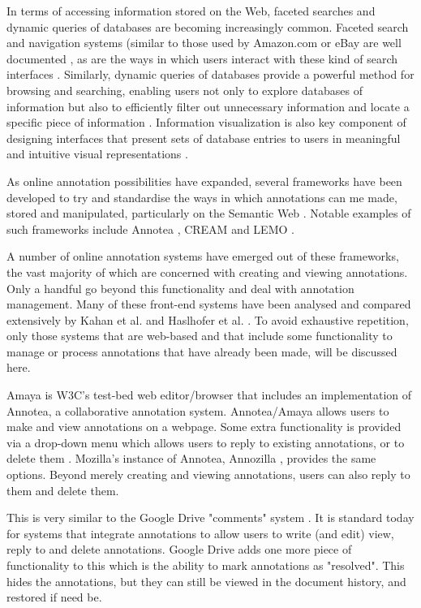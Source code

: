 In terms of accessing information stored on the Web, faceted searches and dynamic queries of databases are becoming increasingly common. Faceted search and navigation systems (similar to those used by Amazon.com \citep{Amazon} or eBay \citep{eBay} are well documented \citep{Hearst} \citep{Yitzhak}, as are the ways in which users interact with these kind of search interfaces \citep{Kules}. Similarly, dynamic queries of databases provide a powerful method for browsing and searching, enabling users not only to explore databases of information but also to efficiently filter out unnecessary information and locate a specific piece of information \cite{ShneidermanDynamic} \citep{PlaisantQueryPreview}. Information visualization is also key component of designing interfaces that present sets of database entries to users in meaningful and intuitive visual representations \citep{Card}. 

As online annotation possibilities have expanded, several frameworks have been developed to try and standardise the ways in which annotations can me made, stored and manipulated, particularly on the Semantic Web \citep{Berners-Lee} \citep{Uren}. Notable examples of such frameworks include Annotea \citep{kahan2002annotea}, CREAM \citep{handschuh2002authoring} and LEMO \citep{LEMO}.  

A number of online annotation systems have emerged out of these frameworks, the vast majority of which are concerned with creating and viewing annotations. Only a handful go beyond this functionality and deal with annotation management. Many of these front-end systems have been analysed and compared extensively by Kahan et al. \citep{kahan2002annotea} and Haslhofer et al. \citep{LEMO}. To avoid exhaustive repetition, only those systems that are web-based and that include some functionality to manage or process annotations that have already been made, will be discussed here.

Amaya \citep{Amaya} is W3C's test-bed web editor/browser that includes an implementation of Annotea, a collaborative annotation system. Annotea/Amaya allows users to make and view annotations on a webpage. Some extra functionality is provided via a drop-down menu which allows users to reply to existing annotations, or to delete them \citep{Annotea}. Mozilla's instance of Annotea, Annozilla \citep{Annozilla}, provides the same options. Beyond merely creating and viewing annotations, users can also reply to them and delete them. 

This is very similar to the Google Drive "comments" system \citep{GDrive}. It is standard today for systems that integrate annotations to allow users to write (and edit) view, reply to and delete annotations. Google Drive adds one more piece of functionality to this which is the ability to mark annotations as "resolved". This hides the annotations, but they can still be viewed in the document history, and restored if need be.

